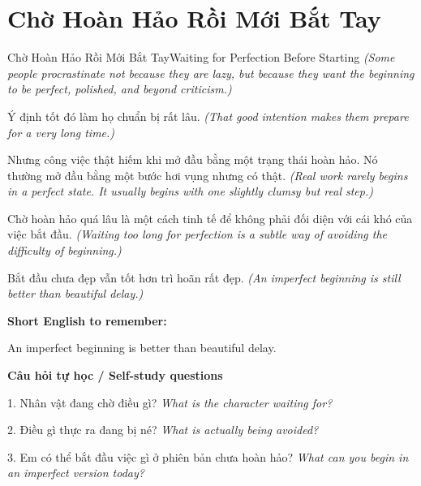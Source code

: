 \section{Chờ Hoàn Hảo Rồi Mới Bắt Tay}
\begin{truyen}{Chờ Hoàn Hảo Rồi Mới Bắt Tay}{Waiting for Perfection Before Starting}
\textit{(Some people procrastinate not because they are lazy, but because they want the beginning to be perfect, polished, and beyond criticism.)}

Ý định tốt đó làm họ chuẩn bị rất lâu.
\textit{(That good intention makes them prepare for a very long time.)}

Nhưng công việc thật hiếm khi mở đầu bằng một trạng thái hoàn hảo. Nó thường mở đầu bằng một bước hơi vụng nhưng có thật.
\textit{(Real work rarely begins in a perfect state. It usually begins with one slightly clumsy but real step.)}

Chờ hoàn hảo quá lâu là một cách tinh tế để không phải đối diện với cái khó của việc bắt đầu.
\textit{(Waiting too long for perfection is a subtle way of avoiding the difficulty of beginning.)}

\end{truyen}

\begin{baihoc}
Bắt đầu chưa đẹp vẫn tốt hơn trì hoãn rất đẹp.
\textit{(An imperfect beginning is still better than beautiful delay.)}
\end{baihoc}

\begin{ghinhoanh}
\textbf{Short English to remember:}

An imperfect beginning is better than beautiful delay.

\end{ghinhoanh}

\begin{tuhocnhanh}
\textbf{Câu hỏi tự học / Self-study questions}

1. Nhân vật đang chờ điều gì? \textit{What is the character waiting for?}

2. Điều gì thực ra đang bị né? \textit{What is actually being avoided?}

3. Em có thể bắt đầu việc gì ở phiên bản chưa hoàn hảo? \textit{What can you begin in an imperfect version today?}
\end{tuhocnhanh}
\ngancach

